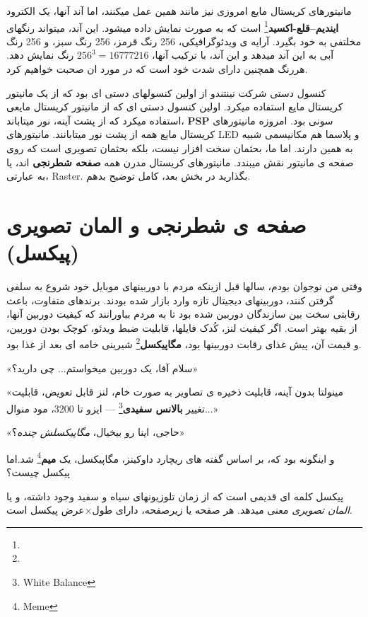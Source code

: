 \documentclass[14pt,a4paper]{memoir}
\begin{document}
مانیتورهای کریستال مایع امروزی نیز مانند همین عمل میکنند، اما آند آنها، یک الکترود \textbf{ایندیم--قلع-اکسید}\footnote{} است که به صورت  نمایش داده میشود. این آند، میتواند رنگهای مخلتفی به خود بگیرد.  آرایه ی ویدئوگرافیکی، 256 رنگ قرمز، 256 رنگ سبز، و 256 رنگ آبی به این آند میدهد و این آند، با ترکیب آنها، $ 256^3 = 16777216 $ رنگ نمایش دهد. هررنگ همچنین دارای شدت خود است که در مورد ان صحبت خواهیم کرد. 

کنسول دستی \textbf{} شرکت نینتندو از اولین کنسولهای دستی ای بود که از یک مانیتور کریستال مایع استفاده میکرد. اولین کنسول دستی ای که از مانیتور کریستال مایعی استفاده میکرد که از پشت آینه، نور میتاباند، \textbf{PSP} سونی بود. امروزه مانیتورهای کریستال مایع همه از پشت نور میتابانند. مانیتورهای LED و پلاسما هم مکانیسمی شبیه به همین دارند. اما ما، بحثمان سخت افزار نیست، بلکه بحثمان تصویری است که روی صفحه ی مانیتور نقش میبندد. مانیتورهای کریستال مدرن همه \textbf{صفحه شطرنجی} اند، یا به عبارتی، Raster. بگذارید در بخش بعد، کامل توضیح بدهم.


	 
	 \section{ صفحه ی شطرنجی و المان تصویری (پیکسل)}\label{raster}
	 وقتی من نوجوان بودم، سالها قبل ازینکه مردم با دوربینهای موبایل خود شروع به سلفی گرفتن کنند، دوربینهای دیجیتال تازه وارد بازار شده بودند. برندهای متفاوت، باعث رقابتی سخت بین سازندگان دوربین شده بود تا به مردم بباورانند که کیفیت دوربین آنها، از بقیه بهتر است. اگر کیفیت لنز، کُدک فایلها، قابلیت ضبط ویدئو، کوچک بودن دوربین، و قیمت آن، پیش غذای رقابت دوربینها بود، \textbf{مگاپیکسل}\footnote{} شیرینی خامه ای بعد از غذا بود. 
	 
	 «سلام آقا، یک دوربین میخواستم... چی دارید؟»
	 
	 «مینولتا بدون آینه، قابلیت ذخیره ی تصاویر به صورت خام، لنز قابل تعویض، قابلیت تغییر \textbf{بالانس سفیدی}\footnote{White Balance} --- ایزو تا 3200، مود منوال...»
	 
	«حاجی، اینا رو بیخیال، \textit{مگاپیکسلش چنده}؟»
	 
	 
	 و اینگونه بود که، بر اساس گفته های ریچارد داوکینز، مگاپیکسل، یک \textbf{میم}\footnote{Meme} شد.اما پیکسل چیست؟
	 
	 پیکسل کلمه ای قدیمی است که از زمان تلوزیونهای سیاه و سفید وجود داشته، و  یا \textit{المان تصویری} معنی میدهد. هر صفحه یا زیرصفحه، دارای طول$ \times $عرض پیکسل است.
	 
\end{document}

